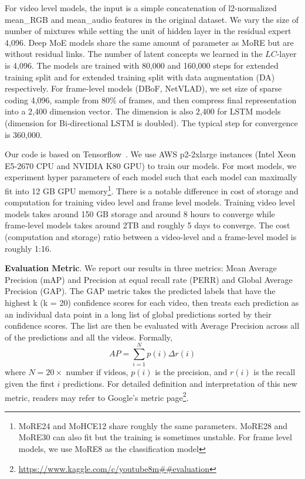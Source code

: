 \documentclass[10pt,twocolumn,letterpaper]{article}
\begin{document}
For video level models, the input is a simple concatenation of l2-normalized mean\_RGB and mean\_audio features in the original dataset. We vary the size of number of mixtures while setting the unit of hidden layer in the residual expert 4,096. Deep MoE models share the same amount of parameter as MoRE but are without residual links. The number of latent concepts we learned in the $LC$-layer is 4,096. The models are trained with 80,000 and 160,000 steps for extended training split and for extended training split with data augmentation (DA) respectively. For frame-level models (DBoF, NetVLAD), we set size of sparse coding 4,096, sample from 80\% of frames, and then compress final representation into a 2,400 dimension vector. The dimension is also 2,400 for LSTM models (dimension for Bi-directional LSTM is doubled).  The typical step for convergence is 360,000.


Our code is based on Tensorflow~\cite{tensorflow}. We use AWS p2-2xlarge instances (Intel Xeon E5-2670 CPU and NVIDIA K80 GPU) to train our models. For most models, we experiment hyper parameters of each model such that each model can maximally fit into 12 GB GPU memory\footnote{MoRE24 and MoHCE12 share roughly the same parameters. MoRE28 and MoRE30 can also fit but the training is sometimes unstable. For frame level models, we use MoRE8 as the classification model}.
There is a notable difference in cost of storage and computation for training video level and frame level models. Training video level models takes around 150 GB storage and around 8 hours to converge while frame-level models takes around 2TB and roughly 5 days to converge. The cost (computation and storage) ratio between a video-level and a frame-level model is roughly 1:16.

\textbf{Evaluation Metric}. We report our results in three metrics: Mean Average Precision (mAP) and Precision at equal recall rate (PERR) \cite{yt8m} and Global Average Precision (GAP). The GAP metric takes the predicted labels that have the highest k (k = 20) confidence scores for each video, then treats each prediction as an individual data point in a long list of global predictions sorted by their confidence scores. The list are then be evaluated with  Average Precision across all of the predictions and all the videos. Formally, 
\begin{equation}
AP=\sum_{i=1}^{N}p(i)\Delta r(i)
\end{equation}
where $N = 20 \times \text{ number if videos}$, $p(i)$ is the precision, and $r(i)$ is the recall given the first $i$ predictions. For detailed definition and interpretation of this new metric, readers may refer to Google's metric page\footnote{\url{https://www.kaggle.com/c/youtube8m##evaluation}}.
\end{document}
